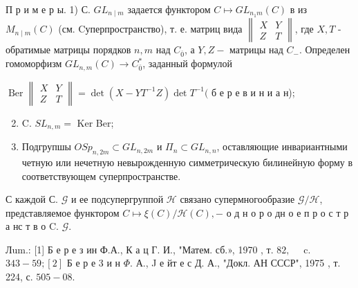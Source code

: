 \documentclass[10pt]{article}
\begin{document}
П р и м е р ы. 1) С. $G L_{n \mid m}$ задается функтором $C \longmapsto G L_{n_{1} m}(C)$ в из $M_{n \mid m}(C)$ (см. Cуперпространство), т. е. матриц вида $\left\|\begin{array}{ll}X & Y \\ Z & T\end{array}\right\|$, где $X, T$ - обратимые матрицы порядков $n, m$ над $C_{\overline{0}}$, а $Y, Z-$ матрицы над $C_{-}$. Определен гомоморфизм $G L_{n, m}(C) \rightarrow C_{\overline{0}}^{*}$, заданный формулой



$\operatorname{Ber}\left\|\begin{array}{ll}X & Y \\ Z & T\end{array}\right\|=\operatorname{det}\left(X-Y T^{-1} Z\right) \operatorname{det} T^{-1}($ б е р е в и н и а н);



\begin{enumerate}

  \setcounter{enumi}{1}

  \item C. $S L_{n, m}=$ Ker Ber;



  \item Подгрупшы $O S p_{n, 2 m} \subset G L_{n, 2 m}$ и $\Pi_{n} \subset G L_{n, n}$, оставляющие инвариантными четную или нечетную невырожденную симметрическую билинейную форму в соответствующем суперпространстве.



\end{enumerate}



С каждой С. $\mathcal{G}$ и ее подсупергруппой $\mathscr{H}$ связано супермногообразие $\mathscr{G} / \mathscr{H}$, представляемое функтором $C \longmapsto \xi(C) / \mathscr{H}(C),-$ о д н о р о дн о е п р о с т р а нс т в о C. $\mathscr{G}$.



Лum.: [1] Б е р е з ин Ф.А., К а ц Г. И., "Матем. сб.», 1970 , т. $82, \quad$ c. $343-59 ;[2]$ Б е р е 3 и н $\Phi$. А., J е йт е с Д. А., "Докл. АН СССР", 1975 , т. 224, с. $505-08$.
\end{document}
